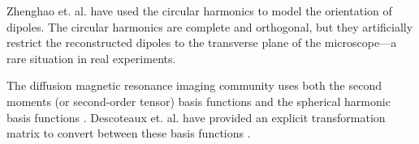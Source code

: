 \documentclass[]{osa-article}
\begin{document}
Zhenghao et. al. \cite{zhanghao2017} have used the circular harmonics to model
the orientation of dipoles. The circular harmonics are complete and orthogonal,
but they artificially restrict the reconstructed dipoles to the transverse
plane of the microscope---a rare situation in real experiments.

The diffusion magnetic resonance imaging community uses both the second moments
(or second-order tensor) basis functions \cite{basser1994} and the spherical
harmonic basis functions \cite{tournier2004}. Descoteaux et. al. have provided
an explicit transformation matrix to convert between these basis functions
\cite{descoteaux2006}.




\end{document}
